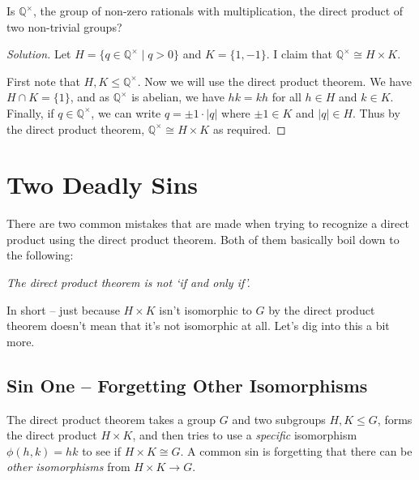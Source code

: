 \documentclass[11pt]{article}
\begin{document}
\begin{example}
	Is $\mathbb{Q}^\times$, the group of non-zero rationals with multiplication, the direct product of two non-trivial groups?
\end{example}
\begin{proof}[Solution]
	Let $H = \{q \in \mathbb{Q}^\times \mid q > 0 \}$ and $K = \{1, -1\}$. I claim that $\mathbb{Q}^\times \cong H \times K$. 
	
	First note that $H, K \leq \mathbb{Q}^\times$. Now we will use the direct product theorem. We have $H \cap K = \{1 \}$, and as $\mathbb{Q}^\times$ is abelian, we have $hk = kh$ for all $h \in H$ and $k \in K$. Finally, if $q \in \mathbb{Q}^\times$, we can write $q = \pm 1 \cdot |q|$ where $\pm 1 \in K$ and $|q| \in H$. Thus by the direct product theorem, $\mathbb{Q}^\times \cong H \times K$ as required.
\end{proof}

\section{ Two Deadly Sins}

There are two common mistakes that are made when trying to recognize a direct product using the direct product theorem. Both of them basically boil down to the following:

\begin{center}
	\emph{The direct product theorem is not `if and only if'.}
\end{center}

In short -- just because $H \times K$ isn't isomorphic to $G$ by the direct product theorem doesn't mean that it's not isomorphic at all.
Let's dig into this a bit more.

\subsection{Sin One -- Forgetting Other Isomorphisms}

The direct product theorem takes a group $G$ and two subgroups $H, K \leq G$, forms the direct product $H \times K$, and then tries to use a \emph{specific} isomorphism $\phi(h, k) = hk$ to see if $H \times K \cong G$. A common sin is forgetting that there can be \emph{other isomorphisms} from $H \times K \rightarrow G$. 
\end{document}

